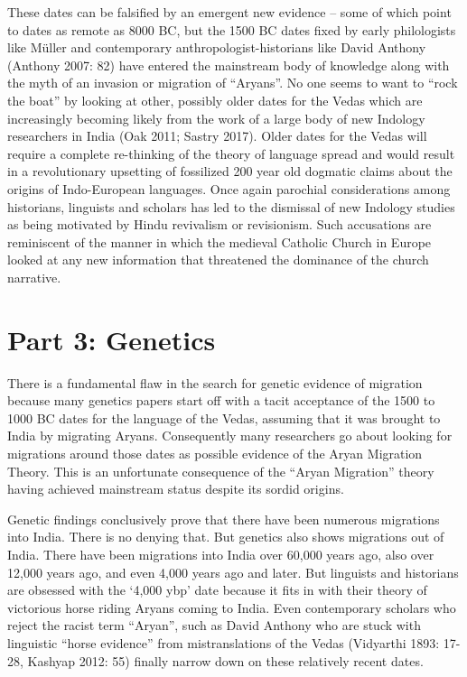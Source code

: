 These dates can be falsified by an emergent new evidence – some of which point to dates as remote as 8000 BC, but the 1500 BC dates fixed by early philologists like Müller and contemporary anthropologist-historians like David Anthony (Anthony 2007: 82) have entered the mainstream body of knowledge along with the myth of an invasion or migration of “Aryans”. No one seems to want to “rock the boat” by looking at other, possibly older dates for the Vedas which are increasingly becoming likely from the work of a large body of new Indology researchers in India (Oak 2011; Sastry 2017). Older dates for the Vedas will require a complete re-thinking of the theory of language spread and would result in a revolutionary upsetting of fossilized 200 year old dogmatic claims about the origins of Indo-European languages. Once again parochial considerations among historians, linguists and scholars has led to the dismissal of new Indology studies as being motivated by Hindu revivalism or revisionism. Such accusations are reminiscent of the manner in which the medieval Catholic Church in Europe looked at any new information that threatened the dominance of the church narrative.


\section*{Part 3: Genetics}

There is a fundamental flaw in the search for genetic evidence of migration because many genetics papers start off with a tacit acceptance of the 1500 to 1000 BC dates for the language of the Vedas, assuming that it was brought to India by migrating Aryans. Consequently many researchers go about looking for migrations around those dates as possible evidence of the Aryan Migration Theory. This is an unfortunate consequence of the “Aryan Migration” theory having achieved mainstream status despite its sordid origins.

Genetic findings conclusively prove that there have been numerous migrations into India. There is no denying that. But genetics also shows migrations out of India. There have been migrations into India over 60,000 years ago, also over 12,000 years ago, and even 4,000 years ago and later. But linguists and historians are obsessed with the ‘4,000 ybp’ date because it fits in with their theory of victorious horse riding Aryans coming to India. Even contemporary scholars who reject the racist term “Aryan”, such as David Anthony who are stuck with linguistic “horse evidence” from mistranslations of the Vedas (Vidyarthi 1893: 17-28, Kashyap 2012: 55) finally narrow down on these relatively recent dates.

